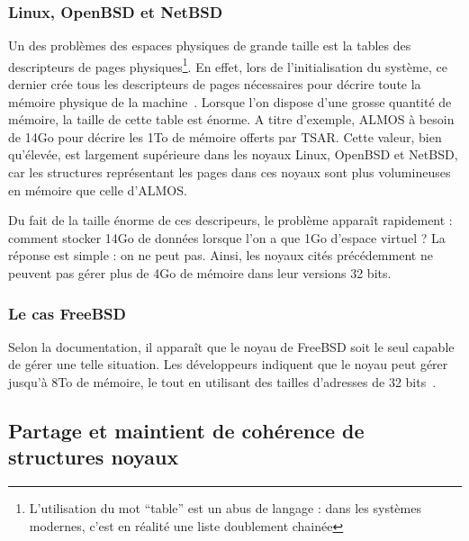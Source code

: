     \subsubsection{Linux, OpenBSD et NetBSD}
  
      Un des problèmes des espaces physiques de grande taille est la tables des
      descripteurs de pages physiques\footnote{L’utilisation du mot “table” est
        un abus de langage : dans les systèmes modernes, c’est en réalité une
        liste doublement chainée}. En effet, lors de l’initialisation du
      système, ce dernier crée tous les descripteurs de pages nécessaires pour
      décrire toute la mémoire physique de la machine~\citep{cranor1999uvm,
        gorman2004understanding}. Lorsque l’on dispose d’une grosse quantité de
      mémoire, la taille de cette table est énorme. A titre d’exemple, ALMOS à
      besoin de 14Go pour décrire les 1To de mémoire offerts par TSAR. Cette
      valeur, bien qu’élevée, est largement supérieure dans les noyaux Linux,
      OpenBSD et NetBSD, car les structures représentant les pages dans ces
      noyaux sont plus volumineuses en mémoire que celle d’ALMOS.

      Du fait de la taille énorme de ces descripeurs, le problème apparaît
      rapidement : comment stocker 14Go de données lorsque l’on a que 1Go
      d’espace virtuel ?  La réponse est simple : on ne peut pas.  Ainsi, les
      noyaux cités précédemment ne peuvent pas gérer plus de 4Go de mémoire dans
      leur versions 32 bits.


    \subsubsection{Le cas FreeBSD}

      Selon la documentation, il apparaît que le noyau de FreeBSD soit le seul
      capable de gérer une telle situation. Les développeurs indiquent que le
      noyau peut gérer jusqu’à 8To de mémoire, le tout en utilisant des tailles
      d’adresses de 32 bits~\citep{kernelfreebsd, mckusick1996design}.


      
  \subsection{Partage et maintient de cohérence de structures noyaux}
  \label{sec:consistency}
  




